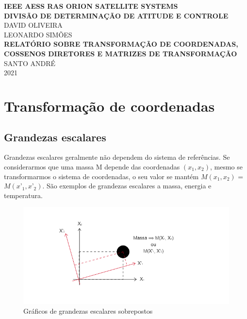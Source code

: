 \documentclass[12pt,a4paper]{article}
\begin{document}
\onehalfspacing %


\begin{titlepage}
    \begin{center}
        \textbf{IEEE AESS RAS ORION SATELLITE SYSTEMS}\\ [0.2cm]
        \textbf{DIVISÃO DE DETERMINAÇÃO DE ATITUDE E CONTROLE}\\ [2.5cm]
        DAVID OLIVEIRA\\ [0.2cm]
        LEONARDO SIMÕES\\ [4cm]
        \textbf{RELATÓRIO SOBRE TRANSFORMAÇÃO DE COORDENADAS, COSSENOS DIRETORES E MATRIZES DE TRANSFORMAÇÃO}\\ [10.5cm]
        SANTO ANDRÉ\\ [0.2cm]
        2021\\ [0.2cm]
    \end{center}
\end{titlepage}


\section{Transformação de coordenadas}

\subsection{Grandezas escalares}

Grandezas escalares geralmente não dependem do sistema de referências. Se considerarmos que uma massa M depende das coordenadas $(x_1, x_2)$, mesmo se transformarmos o sistema de coordenadas, o seu valor se mantém $M(x_1,x_2)$ = $M(x’_1,x’_2)$. São exemplos de grandezas escalares a massa, energia e temperatura.


\begin{figure}[H]
    \centering
    \includegraphics[width=18cm]{escalar.png} %
    \caption{Gráficos de grandezas escalares sobrepostos}
    \label{Fig01} %
\end{figure}
\end{document}
